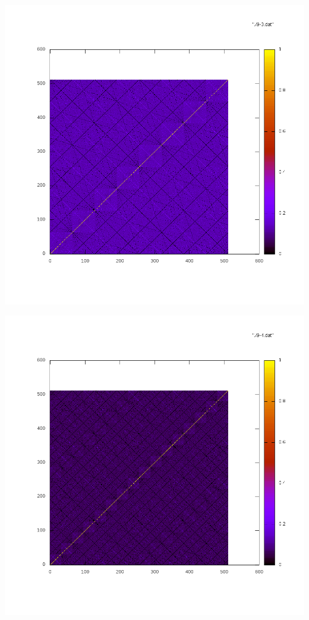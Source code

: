 \documentclass{patmorin}
\begin{document}
\noindent \includegraphics[width=\textwidth]{9-3}

\noindent \includegraphics[width=\textwidth]{9-4}
\end{document}

